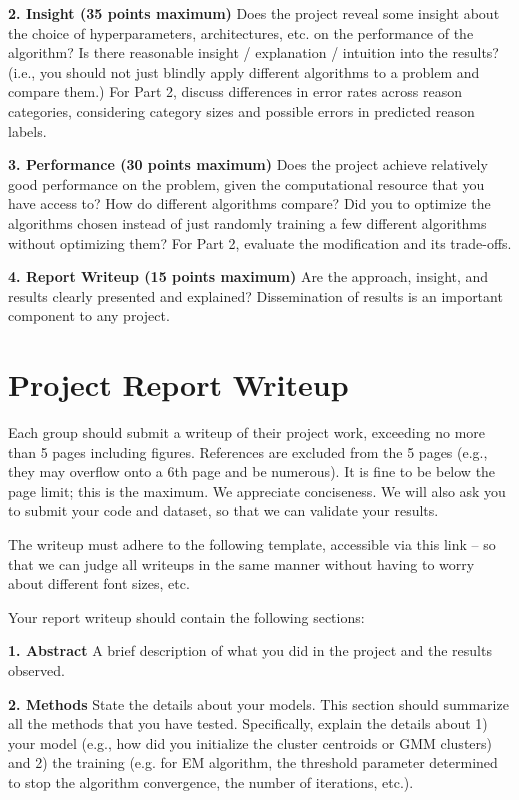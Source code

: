 \documentclass[11pt,letterpaper]{article}
\begin{document}
\textbf{2. Insight (35 points maximum)} Does the project reveal some insight about the choice of hyperparameters, architectures, etc. on the performance of the algorithm? Is there reasonable insight / explanation / intuition into the results? (i.e., you should not just blindly apply different algorithms to a problem and compare them.) For Part 2, discuss differences in error rates across reason categories, considering category sizes and possible errors in predicted reason labels.

\textbf{3. Performance (30 points maximum)} Does the project achieve relatively good performance on the problem, given the computational resource that you have access to? How do different algorithms compare? Did you to optimize the algorithms chosen instead of just randomly training a few different algorithms without optimizing them? For Part 2, evaluate the modification and its trade-offs.

\textbf{4. Report Writeup (15 points maximum)} Are the approach, insight, and results clearly presented and explained? Dissemination of results is an important component to any project.

\section*{Project Report Writeup}

Each group should submit a writeup of their project work, exceeding no more than 5 pages including
figures. References are excluded from the 5 pages (e.g., they may overflow onto a 6th page and be
numerous). It is fine to be below the page limit; this is the maximum. We appreciate conciseness. We
will also ask you to submit your code and dataset, so that we can validate your results.

The writeup must adhere to the following template, accessible via this link -- so that we can judge
all writeups in the same manner without having to worry about different font sizes, etc.

Your report writeup should contain the following sections:

\textbf{1. Abstract} A brief description of what you did in the project and the results observed.

\textbf{2. Methods} State the details about your models. This section should summarize all the methods that you have tested. Specifically, explain the details about 1) your model (e.g., how did you initialize the cluster centroids or GMM clusters) and 2) the training (e.g. for EM algorithm, the threshold parameter determined to stop the algorithm convergence, the number of iterations, etc.).
\end{document}
